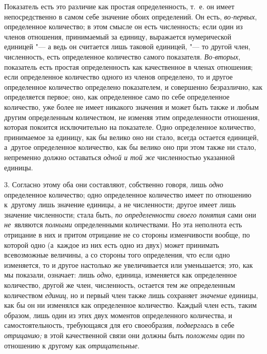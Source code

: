 Показатель есть это различие как простая определенность, т.~е. он имеет
непосредственно в самом себе значение обоих определений. Он есть, {\em
во-первых}, определенное количество; в этом смысле он есть численность; если
один из членов отношения, принимаемый за единицу, выражается нумерической
единицей "--- а ведь он считается лишь таковой единицей, "--- то другой член,
численность, есть определенное количество самого показателя. {\em Во-вторых},
показатель есть простая определенность как качественное в членах отношения;
если определенное количество одного из членов определено, то и другое
определенное количество определено показателем, и совершенно безразлично, как
определяется первое; оно, как определенное само по себе определенное
количество, уже более не имеет никакого значения и может быть также и любым
другим определенным количеством, не изменяя этим определенности отношения,
которая покоится исключительно на показателе. Одно определенное количество,
принимаемое за единицу, как бы велико оно ни стало, всегда остается единицей,
а~другое определенное количество, как бы велико оно при этом также ни стало,
непременно должно оставаться {\em одной и той же} численностью указанной
единицы.

3. Согласно этому оба они составляют, собственно говоря, лишь {\em одно}
определенное количество; одно определенное количество имеет по отношению
к~другому лишь значение единицы, а не численности; другое имеет лишь значение
численности; стала быть, {\em по определенности своего понятия} сами они
{\em не}~являются {\em полными} определенными количествами. Но эта неполнота
есть отрицание в них и притом отрицание не со стороны изменчивости вообще, по
которой одно (а~каждое из них есть одно из двух) может принимать всевозможные
величины, а со стороны того определения, что если одно изменяется, то и другое
настолько же увеличивается или уменьшается; это, как мы показали, означает:
лишь {\em одно}, единица, изменяется как определенное количество, другой же
член, численность, остается тем же определенным количеством {\em единиц}, но и
первый член также лишь сохраняет {\em значение} единицы, как бы он ни изменялся
как определенное количество. Каждый член есть, таким образом, лишь один из этих
двух моментов определенного количества, и самостоятельность, требующаяся для
его своеобразия, {\em подверглась} в себе {\em отрицанию;} в этой качественной
связи они должны быть {\em положены} один по отношению к другому как
{\em отрицательные}.


